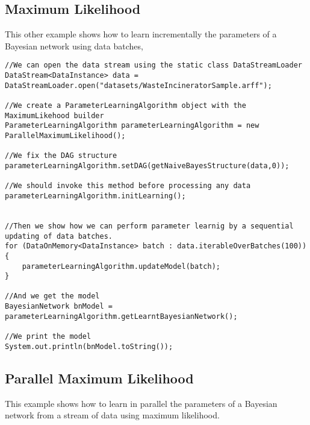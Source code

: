 \subsection{Maximum Likelihood}

This other example shows how to learn incrementally the parameters of a Bayesian network using data batches,
\begin{lstlisting}
//We can open the data stream using the static class DataStreamLoader
DataStream<DataInstance> data = DataStreamLoader.open("datasets/WasteIncineratorSample.arff");

//We create a ParameterLearningAlgorithm object with the MaximumLikehood builder
ParameterLearningAlgorithm parameterLearningAlgorithm = new ParallelMaximumLikelihood();

//We fix the DAG structure
parameterLearningAlgorithm.setDAG(getNaiveBayesStructure(data,0));

//We should invoke this method before processing any data
parameterLearningAlgorithm.initLearning();


//Then we show how we can perform parameter learnig by a sequential updating of data batches.
for (DataOnMemory<DataInstance> batch : data.iterableOverBatches(100)){
    parameterLearningAlgorithm.updateModel(batch);
}

//And we get the model
BayesianNetwork bnModel = parameterLearningAlgorithm.getLearntBayesianNetwork();

//We print the model
System.out.println(bnModel.toString());
\end{lstlisting}

\subsection{Parallel Maximum Likelihood}

This example shows how to learn in parallel the parameters of a Bayesian network from a stream of data using maximum likelihood.


